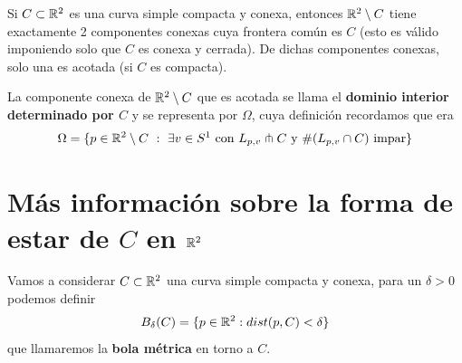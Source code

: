 \begin{teo}\label{teo:curva_jordan}
    Si $C\subset \mathbb{R}^2$ es una curva simple compacta y conexa, entonces $\mathbb{R}^2 \setminus C$ tiene exactamente 2 componentes conexas cuya frontera común es $C$ (esto es válido imponiendo solo que $C$ es conexa y cerrada). De dichas componentes conexas, solo una es acotada (si $C$ es compacta).
\end{teo}

\begin{definicion}
    La componente conexa de $\mathbb{R}^2\setminus C$ que es acotada se llama el \textbf{dominio interior determinado por $C$} y se representa por $\Omega$, cuya definición recordamos que era
    \begin{gather*}
        \Omega = \{p\in \mathbb{R}^2 \setminus C \ : \ \exists v \in S^1 \text{ con } L_{p,v}\pitchfork C \text{ y } \#(L_{p,v} \cap C) \text{ impar}\}
    \end{gather*} 
\end{definicion}

\section{Más información sobre la forma de estar de $C$ en $\mathbb{R}^2$}
\begin{definicion}
    Vamos a considerar $C\subset \mathbb{R}^2$ una curva simple compacta y conexa, para un $\delta>0$ podemos definir
    \begin{gather*}
        B_\delta(C) = \{p\in \mathbb{R}^2 : dist(p,C) < \delta\}
    \end{gather*}
    que llamaremos la \textbf{bola métrica} en torno a $C$.
\end{definicion}

